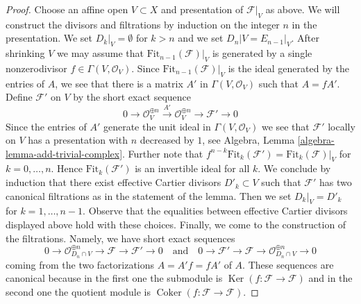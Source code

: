 \documentclass[10pt,a4paper]{amsart}
\theoremstyle{plain}
\theoremstyle{definition}
\theoremstyle{remark}
\numberwithin{equation}{subsection}
\def\Ker{\mathop{\mathrm{Ker}}}
\def\Coker{\mathop{\mathrm{Coker}}}
\begin{document}
\begin{proof}
\medskip\noindent
Choose an affine open $V \subset X$ and presentation of $\mathcal{F}|_V$
as above. We will construct the divisors and filtrations by induction
on the integer $n$ in the presentation. We set $D_k|_V = \emptyset$
for $k > n$ and we set $D_n|V = E_{n - 1}|_V$.
After shrinking $V$ we may assume that
$\text{Fit}_{n - 1}(\mathcal{F})|_V$ is generated by a
single nonzerodivisor $f \in \Gamma(V, \mathcal{O}_V)$.
Since $\text{Fit}_{n - 1}(\mathcal{F})|_V$ is the ideal generated
by the entries of $A$, we see that there is a matrix
$A'$ in $\Gamma(V, \mathcal{O}_V)$ such that $A = fA'$.
Define $\mathcal{F}'$ on $V$ by the short exact sequence
$$
0 \to \mathcal{O}_V^{\oplus n} \xrightarrow{A'} \mathcal{O}_V^{\oplus n} \to
\mathcal{F}' \to 0
$$
Since the entries of $A'$ generate the unit ideal in
$\Gamma(V, \mathcal{O}_V)$ we see that $\mathcal{F}'$
locally on $V$ has a presentation with $n$ decreased
by $1$, see Algebra, Lemma \ref{algebra-lemma-add-trivial-complex}.
Further note that
$f^{n - k}\text{Fit}_k(\mathcal{F}') = \text{Fit}_k(\mathcal{F})|_V$
for $k = 0, \ldots, n$. Hence $\text{Fit}_k(\mathcal{F}')$
is an invertible ideal for all $k$. We conclude by induction
that there exist effective Cartier divisors $D'_k \subset V$
such that $\mathcal{F}'$ has two canonical filtrations as in the statement
of the lemma. Then we set $D_k|_V = D'_k$ for $k = 1, \ldots, n - 1$.
Observe that the equalities between effective Cartier divisors
displayed above hold with these choices. Finally, we come
to the construction of the filtrations. Namely,
we have short exact sequences
$$
0 \to
\mathcal{O}_{D_n \cap V}^{\oplus n} \to
\mathcal{F} \to \mathcal{F}' \to 0
\quad\text{and}\quad
0 \to
\mathcal{F}' \to \mathcal{F} \to
\mathcal{O}_{D_n \cap V}^{\oplus n} \to 0
$$
coming from the two factorizations $A = A'f = f A'$ of $A$.
These sequences are canonical because in the first one
the submodule is $\Ker(f : \mathcal{F} \to \mathcal{F})$
and in the second one the quotient module is
$\Coker(f : \mathcal{F} \to \mathcal{F})$.
\end{proof}
\end{document}

